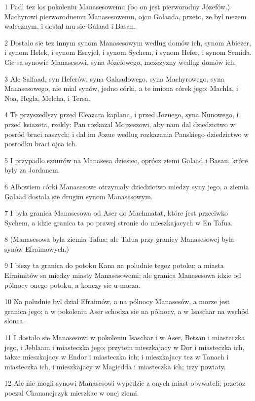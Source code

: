 \par 1 Padl tez los pokoleniu Manasesowemu (bo on jest pierworodny Józefów.) Machyrowi pierworodnemu Manasesowemu, ojcu Galaada, przeto, ze byl mezem walecznym, i dostal mu sie Galaad i Basan.
\par 2 Dostalo sie tez innym synom Manasesowym wedlug domów ich, synom Abiezer, i synom Helek, i synom Esryjel, i synom Sychem, i synom Hefer, i synom Semida. Cic sa synowie Manasesowi, syna Józefowego, mezczyzny wedlug domów ich.
\par 3 Ale Salfaad, syn Heferów, syna Galaadowego, syna Machyrowego, syna Manasesowego, nie mial synów, jedno córki, a te imiona córek jego: Machla, i Noa, Hegla, Melcha, i Tersa.
\par 4 Te przyszedlszy przed Eleazara kaplana, i przed Jozuego, syna Nunowego, i przed ksiazeta, rzekly: Pan rozkazal Mojzeszowi, aby nam dal dziedzictwo w posród braci naszych; i dal im Jozue wedlug rozkazania Panskiego dziedzictwo w posrodku braci ojca ich.
\par 5 I przypadlo sznurów na Manasesa dziesiec, oprócz ziemi Galaad i Basan, które byly za Jordanem.
\par 6 Albowiem córki Manasesowe otrzymaly dziedzictwo miedzy syny jego, a ziemia Galaad dostala sie drugim synom Manasesowym.
\par 7 I byla granica Manasesowa od Aser do Machmatat, które jest przeciwko Sychem, a idzie granica ta po prawej stronie do mieszkajacych w En Tafua.
\par 8 (Manasesowa byla ziemia Tafua; ale Tafua przy granicy Manasesowej byla synów Efraimowych.)
\par 9 I biezy ta granica do potoku Kana na poludnie tegoz potoku; a miasta Efraimitów sa miedzy miasty Manasesowemi; ale granica Manasesowa idzie od pólnocy onego potoku, a konczy sie u morza.
\par 10 Na poludnie byl dzial Efraimów, a na pólnocy Manasesów, a morze jest granica jego; a w pokoleniu Aser schodza sie na pólnocy, a w Isaschar na wschód slonca.
\par 11 I dostalo sie Manasesowi w pokoleniu Isaschar i w Aser, Betsan i miasteczka jego, i Jeblaam i miasteczka jego; przytem mieszkajacy w Dor i miasteczka ich, takze mieszkajacy w Endor i miasteczka ich; i mieszkajacy tez w Tanach i miasteczka ich, i mieszkajacy w Magiedda i miasteczka ich; trzy powiaty.
\par 12 Ale nie mogli synowi Manasesowi wypedzic z onych miast obywateli; przetoz poczal Chananejczyk mieszkac w onej ziemi.
